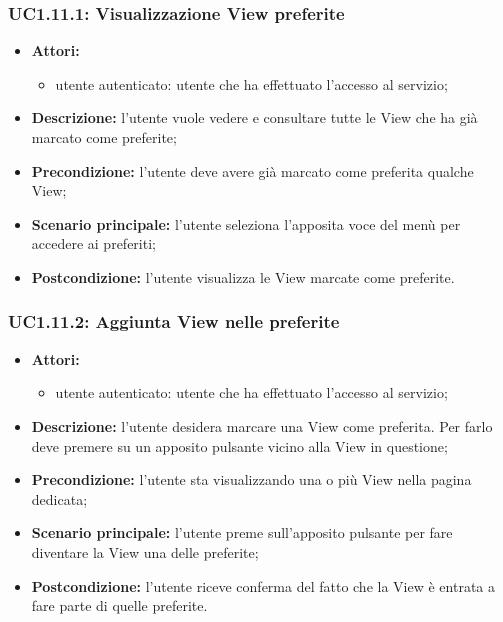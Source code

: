 \subsubsection{UC1.11.1: Visualizzazione View preferite}
\begin{itemize}
	\item \textbf{Attori:}
	\begin{itemize}
		\item utente autenticato: utente che ha effettuato l'accesso al servizio;
	\end{itemize}
	\item \textbf{Descrizione:} l'utente vuole vedere e consultare tutte le View che ha già marcato come preferite;
	\item \textbf{Precondizione:} l'utente deve avere già marcato come preferita qualche View;
	\item \textbf{Scenario principale:} l'utente seleziona l'apposita voce del menù per accedere ai preferiti;
	\item \textbf{Postcondizione:} l'utente visualizza le View marcate come preferite.
\end{itemize}

\subsubsection{UC1.11.2: Aggiunta View nelle preferite}
\begin{itemize}
	\item \textbf{Attori:}
	\begin{itemize}
		\item utente autenticato: utente che ha effettuato l'accesso al servizio;
	\end{itemize}
	\item \textbf{Descrizione:} l'utente desidera marcare una View come preferita. Per farlo deve premere su un apposito pulsante vicino alla View in questione;
	\item \textbf{Precondizione:} l'utente sta visualizzando una o più View nella pagina dedicata;
	\item \textbf{Scenario principale:} l'utente preme sull'apposito pulsante per fare diventare la View una delle preferite;
	\item \textbf{Postcondizione:} l'utente riceve conferma del fatto che la View è entrata a fare parte di quelle preferite.
\end{itemize}


